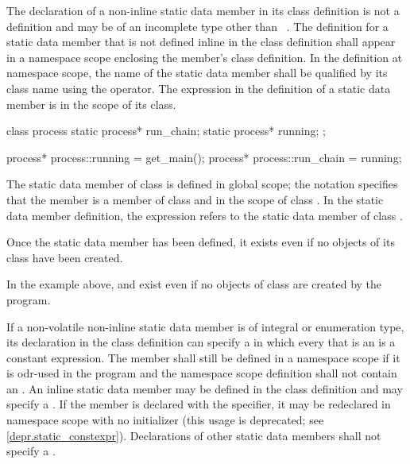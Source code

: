 \pnum
{}%
%
The declaration of a non-inline
static data member in its class definition
is not a definition and may be of an incomplete type other than
\cv{}~. The definition for a static data
member that is not defined inline in the class definition
shall appear in a namespace scope enclosing the member's class
definition.
%
In the definition at namespace scope, the name of the static
data member shall be qualified by its class name using the \tcode{::}
operator. The  expression in the definition of a
static data member is in the scope of its
class.
\begin{example}

\begin{codeblock}
class process {
  static process* run_chain;
  static process* running;
};

process* process::running = get_main();
process* process::run_chain = running;
\end{codeblock}

The static data member  of class
 is defined in global scope; the notation
 specifies that the member 
is a member of class  and in the scope of class
. In the static data member definition, the
 expression refers to the static data
member  of class .
\end{example}

\begin{note}
Once the static data member has been defined, it exists even if
no objects of its class have been created.
\begin{example}
In the example above,  and  exist even
if no objects of class  are created by the program.
\end{example}
\end{note}

\pnum
If a non-volatile non-inline  static data member is
of integral or enumeration type,
its declaration in the class definition can specify a
 in which every
 that is an 
is a constant expression.
The member shall still be defined in a namespace scope if
it is odr-used in the program and the
namespace scope definition shall not contain an .
An inline static data member may be defined in the class definition
and may specify a . If the
member is declared with the  specifier, it may be
redeclared in namespace scope with no initializer (this usage is
deprecated; see \ref{depr.static_constexpr}). Declarations of other
static data members shall not specify a .

